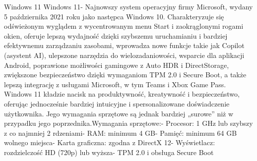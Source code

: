 \begin{frame}{Windows 11}
Windows 11-  Najnowszy system operacyjny firmy Microsoft, wydany 5 października 2021 roku jako następca Windows 10.
 Charakteryzuje się odświeżonym wyglądem z wycentrowanym menu Start i zaokrąglonymi rogami okien, oferuje lepszą wydajność dzięki szybszemu uruchamianiu i bardziej efektywnemu zarządzaniu zasobami, wprowadza nowe funkcje takie jak Copilot (asystent AI), ulepszone narzędzia do wielozadaniowości, wsparcie dla aplikacji Android, poprawione możliwości gamingowe z Auto HDR i DirectStorage, zwiększone bezpieczeństwo dzięki wymaganiom TPM 2.0 i Secure Boot, a także lepszą integrację z usługami Microsoft, w tym Teams i Xbox Game Pass. Windows 11 kładzie nacisk na produktywność, kreatywność i bezpieczeństwo, oferując jednocześnie bardziej intuicyjne i spersonalizowane doświadczenie użytkownika. Jego wymagania sprzętowe są jednak bardziej „surowe” niż w przypadku jego poprzednika.Wymagania sprzętowe:- Procesor: 1 GHz lub szybszy z co najmniej 2 rdzeniami- RAM: minimum 4 GB- Pamięć: minimum 64 GB wolnego miejsca- Karta graficzna: zgodna z DirectX 12- Wyświetlacz: rozdzielczość HD (720p) lub wyższa- TPM 2.0 i obsługa Secure Boot






\end{frame}
